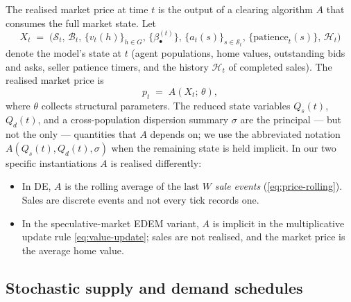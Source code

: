 The realised market price at time $t$ is the output of a clearing
algorithm $A$ that consumes the full market state. Let
\begin{equation}
\label{eq:state}
X_{t} \;=\;
\bigl(\mathcal{S}_{t},\,\mathcal{B}_{t},\,
       \{v_{t}(h)\}_{h \in G},\,
       \{\beta_{\bullet}^{(t)}\},\,
       \{a_{t}(s)\}_{s \in \mathcal{S}_{t}},\,
       \{\text{patience}_{t}(s)\},\,
       \mathcal{H}_{t}\bigr)
\end{equation}
denote the model's state at $t$ (agent populations, home values,
outstanding bids and asks, seller patience timers, and the history
$\mathcal{H}_{t}$ of completed sales). The realised market price is
\begin{equation}
\label{eq:price-functional}
p_{t} \;=\; A(X_{t};\,\theta),
\end{equation}
where $\theta$ collects structural parameters. The reduced state
variables $Q_{s}(t)$, $Q_{d}(t)$, and a cross-population dispersion
summary $\sigma$ are the principal --- but not the only --- quantities
that $A$ depends on; we use the abbreviated notation
$A(Q_{s}(t), Q_{d}(t), \sigma)$ when the remaining state is held
implicit. In our two specific instantiations $A$ is realised
differently:
\begin{itemize}[leftmargin=*,nosep]
\item In DE, $A$ is the rolling average of the last $W$ \emph{sale
      events} (\cref{eq:price-rolling}). Sales are discrete events
      and not every tick records one.
\item In the speculative-market EDEM variant, $A$ is implicit in the
      multiplicative update rule \cref{eq:value-update}; sales are
      not realised, and the market price is the average home value.
\end{itemize}

\subsection{Stochastic supply and demand schedules}
\label{sec:framework-schedules}

